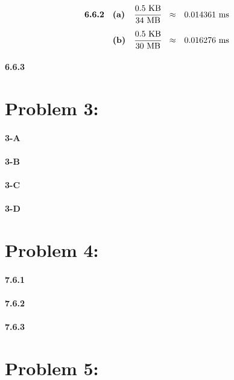 \documentclass[a4paper]{article}
\begin{document}
\begin{equation}
\begin{array}{llrll}
\textbf{6.6.2} & \textbf{(a)} & \cfrac{0.5 \mbox{ KB}}{34 \mbox{ MB}} & \approx & 0.014361 \mbox{ ms} \\[.15in]
& \textbf{(b)} & \cfrac{0.5 \mbox{ KB}}{30 \mbox{ MB}} & \approx & 0.016276 \mbox{ ms}
\end{array}
\end{equation}

\paragraph{6.6.3} 

\section*{Problem 3:}

\paragraph{3-A} 

\paragraph{3-B} 

\paragraph{3-C} 

\paragraph{3-D} 

\section*{Problem 4:}

\paragraph{7.6.1} 

\paragraph{7.6.2} 

\paragraph{7.6.3} 

\section*{Problem 5:}
\end{document}
